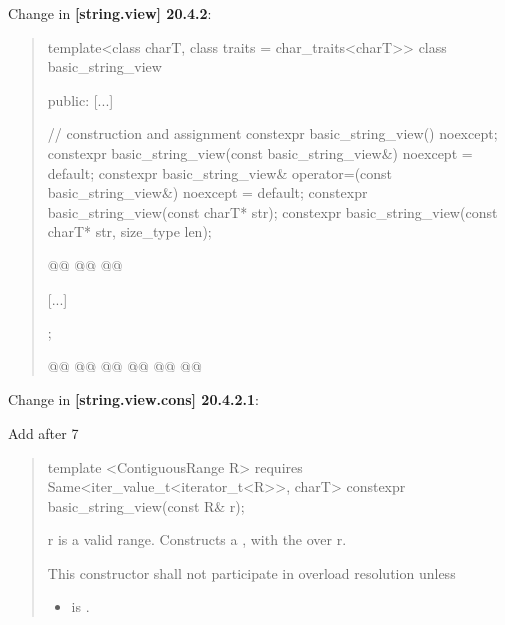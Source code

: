 \documentclass{wg21}
\begin{document}
Change in \textbf{[string.view] 20.4.2}:
\begin{quote}
\begin{codeblock}

template<class charT, class traits = char_traits<charT>>
class basic_string_view {
public:
	[...]

	// construction and assignment
	constexpr basic_string_view() noexcept;
	constexpr basic_string_view(const basic_string_view&) noexcept = default;
	constexpr basic_string_view& operator=(const basic_string_view&) noexcept = default;
	constexpr basic_string_view(const charT* str);
	constexpr basic_string_view(const charT* str, size_type len);

	@@
	@@
	@@

	[...]
};

@@
@@
@@
@@
@@
@\added{\qquad 	>;}@

\end{codeblock}
\end{quote}

Change in \textbf{[string.view.cons] 20.4.2.1}:

Add after 7

\begin{quote}
\begin{addedblock}
\begin{itemdecl}
template <ContiguousRange R>
requires Same<iter_value_t<iterator_t<R>>, charT>
constexpr basic_string_view(const R& r);

\end{itemdecl}

\begin{itemdescr}
	\requires
	r is a valid range.
	\effects
	Constructs a , with the over  r.

	 \remarks This constructor shall not participate in overload resolution unless
	\begin{itemize}
		\item {} is .
	\end{itemize}
\end{itemdescr}
\end{addedblock}
\end{quote}
\end{document}
